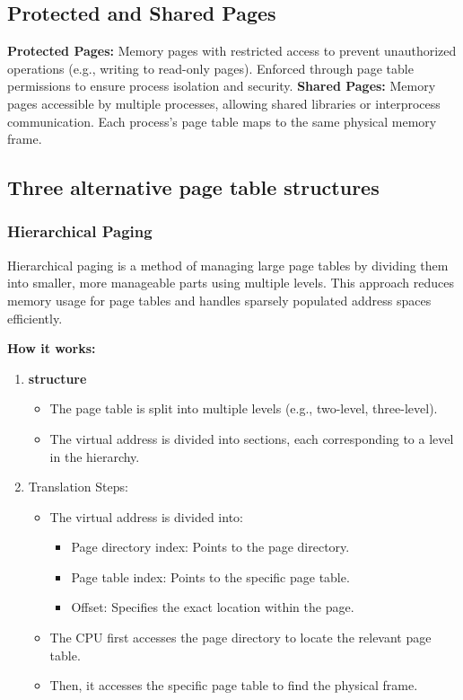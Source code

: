 \documentclass{article}
\begin{document}
\subsection{Protected and Shared Pages}

{\bf Protected Pages: } Memory pages with restricted access to prevent unauthorized operations (e.g., writing to read-only pages). Enforced through page table permissions to ensure process isolation and security.
\newline
\newline
{\bf Shared Pages: } Memory pages accessible by multiple processes, allowing shared libraries or interprocess communication. Each process's page table maps to the same physical memory frame.


\subsection{Three alternative page table structures}

\subsubsection{Hierarchical Paging}
Hierarchical paging is a method of managing large page tables by dividing them into smaller, more manageable parts using multiple levels. This approach reduces memory usage for page tables and handles sparsely populated address spaces efficiently.

{\bf How it works:}
\begin{enumerate}
    \item {\bf structure}
    \begin{itemize}
        \item The page table is split into multiple levels (e.g., two-level, three-level).
        \item The virtual address is divided into sections, each corresponding to a level in the hierarchy.
    \end{itemize}
    \item Translation Steps:
    \begin{itemize}
        \item The virtual address is divided into: \begin{itemize}
            \item Page directory index: Points to the page directory.
            \item Page table index: Points to the specific page table.
            \item Offset: Specifies the exact location within the page.
        \end{itemize}
    \item The CPU first accesses the page directory to locate the relevant page table.
    \item Then, it accesses the specific page table to find the physical frame.
    \end{itemize}
\end{enumerate}
\end{document}
